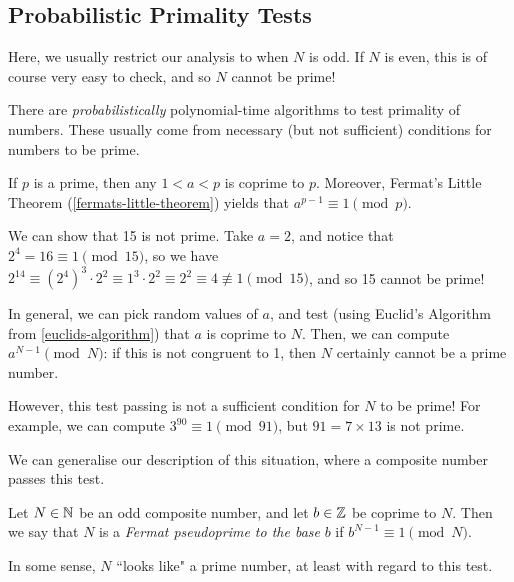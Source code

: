 \documentclass{article}
\begin{document}

\subsection{Probabilistic Primality Tests}
\label{subsection-primality-testing-probabilistic}

\begin{note}
	Here, we usually restrict our analysis to when $N$ is odd. If $N$ is even, this is of course very easy to check, and so $N$ cannot be prime!
\end{note}

There are \textit{probabilistically} polynomial-time algorithms to test primality of numbers. These usually come from necessary (but not sufficient) conditions for numbers to be prime.

\begin{example}
    If $p$ is a prime, then any $1 < a < p$ is coprime to $p$. Moreover, Fermat's Little Theorem (\ref{fermats-little-theorem}) yields that $a^{p-1} \equiv 1 \pmod p$.
    
    We can show that 15 is not prime. Take $a = 2$, and notice that $2^4 = 16 \equiv 1 \pmod{15}$, so we have $2^{14} \equiv (2^4)^3 \cdot 2^2 \equiv 1^3 \cdot 2^2 \equiv 2^2 \equiv 4 \not\equiv 1 \pmod{15}$, and so 15 cannot be prime!
    
    In general, we can pick random values of $a$, and test (using Euclid's Algorithm from \ref{euclids-algorithm}) that $a$ is coprime to $N$. Then, we can compute $a^{N-1} \pmod N$: if this is not congruent to 1, then $N$ certainly cannot be a prime number.
    
    However, this test passing is not a sufficient condition for $N$ to be prime! For example, we can compute $3^{90} \equiv 1 \pmod{91}$, but $91 = 7 \times 13$ is not prime.
\end{example}

We can generalise our description of this situation, where a composite number passes this test.

\begin{definition}
    Let $N \in \mathbb{N}$ be an odd composite number, and let $b \in \mathbb{Z}$ be coprime to $N$. Then we say that $N$ is a \textit{Fermat pseudoprime to the base} $b$ if $b^{N-1} \equiv 1 \pmod N$.
\end{definition}

In some sense, $N$ ``looks like" a prime number, at least with regard to this test.
\end{document}
